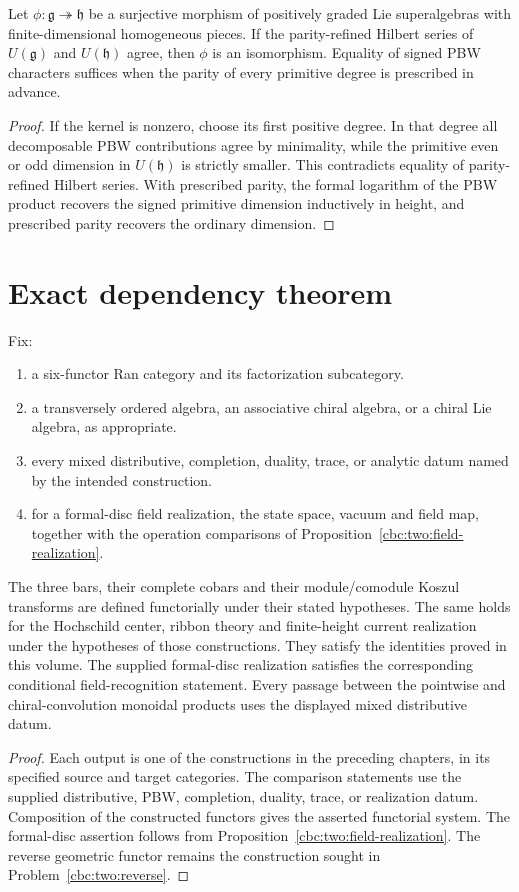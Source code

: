 \begin{recognition}
Let $\phi:\mathfrak g\twoheadrightarrow\mathfrak h$ be a surjective morphism of positively graded Lie superalgebras with finite-dimensional homogeneous pieces.  If the parity-refined Hilbert series of $U(\mathfrak g)$ and $U(\mathfrak h)$ agree, then $\phi$ is an isomorphism.  Equality of signed PBW characters suffices when the parity of every primitive degree is prescribed in advance.
\end{recognition}
\begin{proof}
If the kernel is nonzero, choose its first positive degree.  In that degree all decomposable PBW contributions agree by minimality, while the primitive even or odd dimension in $U(\mathfrak h)$ is strictly smaller.  This contradicts equality of parity-refined Hilbert series.  With prescribed parity, the formal logarithm of the PBW product recovers the signed primitive dimension inductively in height, and prescribed parity recovers the ordinary dimension.
\end{proof}

\chapter{Exact dependency theorem}
\begin{theorem}
Fix:
\begin{enumerate}
\item a six-functor Ran category and its factorization subcategory.
\item a transversely ordered algebra, an associative chiral algebra, or a chiral Lie algebra, as appropriate.
\item every mixed distributive, completion, duality, trace, or analytic datum named by the intended construction.
\item for a formal-disc field realization, the state space, vacuum and field map, together with the operation comparisons of Proposition~\ref{cbc:two:field-realization}.
\end{enumerate}
The three bars, their complete cobars and their module/comodule Koszul transforms are defined functorially under their stated hypotheses.
The same holds for the Hochschild center, ribbon theory and finite-height current realization under the hypotheses of those constructions.
They satisfy the identities proved in this volume.
The supplied formal-disc realization satisfies the corresponding conditional field-recognition statement.
Every passage between the pointwise and chiral-convolution monoidal products uses the displayed mixed distributive datum.
\end{theorem}
\begin{proof}
Each output is one of the constructions in the preceding chapters, in its specified source and target categories.
The comparison statements use the supplied distributive, PBW, completion, duality, trace, or realization datum.
Composition of the constructed functors gives the asserted functorial system.
The formal-disc assertion follows from Proposition~\ref{cbc:two:field-realization}.
The reverse geometric functor remains the construction sought in Problem~\ref{cbc:two:reverse}.
\end{proof}

